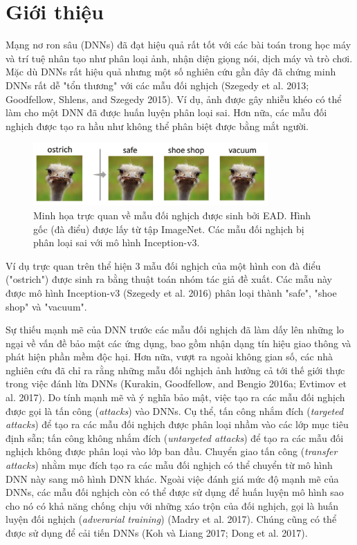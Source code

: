 \chapter{Giới thiệu}
Mạng nơ ron sâu (DNNs) đã đạt hiệu quả rất tốt với các bài toán trong học máy
và trí tuệ nhân tạo như phân loại ảnh, nhận diện giọng nói, dịch máy và trò chơi.
Mặc dù DNNs rất hiệu quả nhưng một số nghiên cứu gần đây đã chứng minh DNNs rất 
dễ  "tổn thương" với các mẫu đối nghịch (Szegedy et al. 2013; Goodfellow, Shlens, 
and Szegedy 2015). Ví dụ, ảnh được gây nhiễu khéo có thể
làm cho một DNN đã được huấn luyện phân loại sai. Hơn nữa, các mẫu đối nghịch
được tạo ra hầu như không thể phân biệt được bằng mắt người. 
\begin{figure}[H] %
    \centering %
    \includegraphics[width=0.8\textwidth]{assets/fig_01.png} 
    \caption{Minh họa trực quan về mẫu đối nghịch được sinh bởi EAD. 
    Hình gốc (đà điểu) được lấy từ tập ImageNet. Các mẫu đối nghịch bị 
    phân loại sai với mô hình Inception-v3.} %
    \label{fig:fg_01}
\end{figure}
Ví dụ trực quan trên thể hiện 3 mẫu đối nghịch của một hình con đà điểu ("ostrich") 
được sinh ra bằng thuật toán nhóm tác giả đề xuất. Các mẫu này được mô hình Inception-v3 
(Szegedy et al. 2016) phân loại thành "safe", "shoe shop" và "vacuum". 

Sự thiếu mạnh mẽ của DNN trước các mẫu đối nghịch đã làm dấy lên những lo ngại 
về vấn đề bảo mật các ứng dụng, bao gồm nhận dạng tín hiệu giao thông 
và phát hiện phần mềm độc hại. Hơn nữa, vượt ra ngoài không gian số, 
các nhà nghiên cứu đã chỉ ra rằng những mẫu đối nghịch ảnh hưởng cả tới thế giới thực trong việc đánh lừa DNNs (Kurakin, Goodfellow, and Bengio 2016a; Evtimov et al. 2017).
Do tính mạnh mẽ và ý nghĩa bảo mật, việc tạo ra các mẫu đối nghịch được gọi là 
tấn công (\textit{attacks}) vào DNNs. Cụ thể, tấn công nhắm đích 
(\textit{targeted attacks}) để tạo ra các mẫu đối nghịch được phân loại nhầm vào các lớp mục tiêu 
định sẵn; tấn công không nhắm đích (\textit{untargeted attacks}) để tạo ra các mẫu đối nghịch không được phân loại vào lớp ban đầu. Chuyển giao tấn công (\textit{transfer attacks}) nhằm mục đích tạo ra các mẫu đối nghịch có thể chuyển 
từ mô hình DNN này sang mô hình DNN khác. Ngoài việc đánh giá mức độ mạnh mẽ của DNNs,
các mẫu đối nghịch còn có thể được sử dụng để huấn luyện mô hình sao cho nó có khả năng chống chịu 
với những xáo trộn của đối nghịch, gọi là huấn luyện đối nghịch (\textit{adverarial training}) 
(Madry et al. 2017). Chúng cũng có thể được sử dụng để cải tiến DNNs (Koh và Liang 2017;
Dong et al. 2017). 

